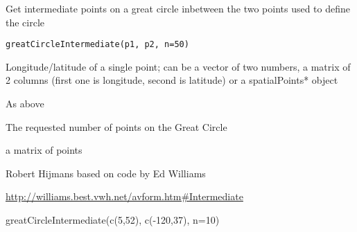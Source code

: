 \begin{Description}\relax
Get intermediate points on a great circle inbetween the two points used to define the circle
\end{Description}
\begin{Usage}
\begin{verbatim}
greatCircleIntermediate(p1, p2, n=50) 
\end{verbatim}
\end{Usage}
\begin{Arguments}
\begin{ldescription}
\item[\code{p1}] Longitude/latitude of a single point; can be a vector of two numbers, a matrix of 2 columns (first one is longitude, second is latitude) or a spatialPoints* object
\item[\code{p2}] As above
\item[\code{n}] The requested number of points on the Great Circle
\end{ldescription}
\end{Arguments}
\begin{Value}
a matrix of points
\end{Value}
\begin{Author}\relax
Robert Hijmans based on code by Ed Williams
\end{Author}
\begin{References}\relax
\url{http://williams.best.vwh.net/avform.htm#Intermediate}
\end{References}
\begin{Examples}
\begin{ExampleCode}
greatCircleIntermediate(c(5,52), c(-120,37), n=10)
\end{ExampleCode}
\end{Examples}

